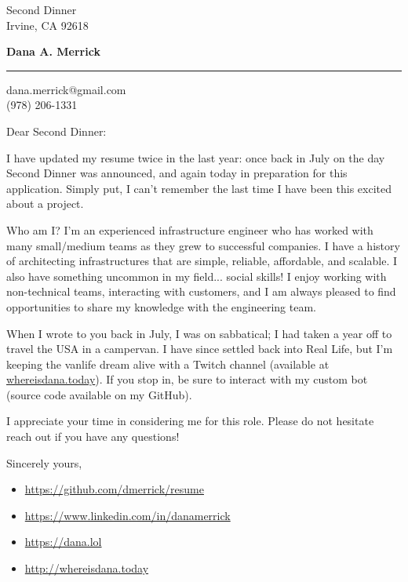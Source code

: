 \documentclass{letter} %
\begin{document}
\signature{Dana A. Merrick}           %
\longindentation=0pt                       %
\let\raggedleft\raggedright                %
 
 
\begin{letter}{Second Dinner \\
Irvine, CA 92618}


\begin{flushleft}
{\large\bf Dana A. Merrick}
\end{flushleft}
\medskip\hrule height 1pt
\begin{flushright}
\hfill dana.merrick@gmail.com \\
\hfill (978) 206-1331
\end{flushright} 

 
\opening{Dear Second Dinner:} 
 
\noindent I have updated my resume twice in the last year: once back in July on the day Second Dinner was announced, and again today in preparation for this application. Simply put, I can't remember the last time I have been this excited about a project.

\noindent Who am I? I'm an experienced infrastructure engineer who has worked with many small/medium teams as they grew to successful companies. I have a history of architecting infrastructures that are simple, reliable, affordable, and scalable. I also have something uncommon in my field... social skills! I enjoy working with non-technical teams, interacting with customers, and I am always pleased to find opportunities to share my knowledge with the engineering team.

\noindent When I wrote to you back in July, I was on sabbatical; I had taken a year off to travel the USA in a campervan. I have since settled back into Real Life, but I'm keeping the vanlife dream alive with a Twitch channel (available at \href{http://whereisdana.today}{whereisdana.today}). If you stop in, be sure to interact with my custom bot (source code available on my GitHub).

\noindent I appreciate your time in considering me for this role. Please do not hesitate reach out if you have any questions!

 
\closing{Sincerely yours,} 


\vfill

\begin{itemize}
	\item \href{https://github.com/dmerrick/resume}{https://github.com/dmerrick/resume}
	\item \href{https://www.linkedin.com/in/danamerrick}{https://www.linkedin.com/in/danamerrick}
	\item \href{https://dana.lol}{https://dana.lol}
	\item \href{http://whereisdana.today}{http://whereisdana.today}
\end{itemize}





\end{letter}
 
\end{document}
